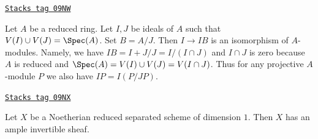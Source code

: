 \begin{remark}[Conductor]
\label{varieties-remark-conductor}
\href{https://stacks.math.columbia.edu/tag/09NW}{\texttt{Stacks tag 09NW}}

Let $A$ be a reduced ring. Let $I, J$ be ideals of $A$
such that $V(I) \cup V(J) = \Spec(A)$. Set $B = A/J$.
Then $I \to IB$ is an isomorphism of $A$-modules. Namely, we
have $IB = I + J/J = I/(I \cap J)$ and $I \cap J$ is zero because
$A$ is reduced and $\Spec(A) = V(I) \cup V(J) = V(I \cap J)$.
Thus for any projective $A$-module $P$ we also have $IP = I(P/JP)$.
\end{remark}

\begin{lemma}
\label{varieties-lemma-dim-1-noetherian-reduced-separated-has-ample}
\href{https://stacks.math.columbia.edu/tag/09NX}{\texttt{Stacks tag 09NX}}

Let $X$ be a Noetherian reduced separated scheme of dimension $1$.
Then $X$ has an ample invertible sheaf.
\end{lemma}

